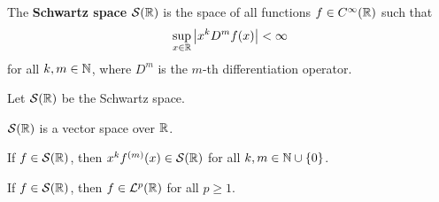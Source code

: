 \begin{definition}
    The \textbf{Schwartz space} $\mathcal{S}(\mathbb{R})$ is the space of all functions $f\in C^\infty(\mathbb{R})$ such that 
    \begin{equation*}
        \sup_{x\in\mathbb{R}}\left\lvert {x^k D^m f(x)} \right\rvert < \infty
    \end{equation*}
    for all $k,m\in\mathbb{N}$, where $D^m$ is the $m$-th differentiation operator.
\end{definition}

\begin{proposition}\label{prop:schwartz_space}
    Let $\mathcal{S}(\mathbb{R})$ be the Schwartz space. 
    \begin{thmenum}
        \item $\mathcal{S}(\mathbb{R})$ is a vector space over $\mathbb{R}$.
        \item If $f\in\mathcal{S}(\mathbb{R})$, then $x^kf^{(m)}(x)\in\mathcal{S}(\mathbb{R})$ for all $k,m\in\mathbb{N}\cup\left\{ {0} \right\}$. 
        \item If $f\in\mathcal{S}(\mathbb{R})$, then $f\in\mathcal{L}^p(\mathbb{R})$ for all $p\geq 1$. 
    \end{thmenum}
\end{proposition}
